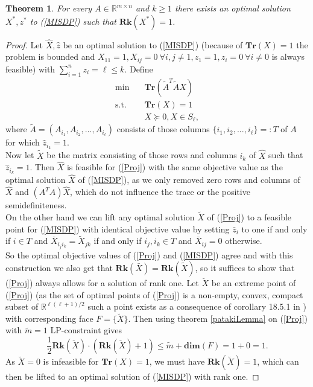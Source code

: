 \documentclass{elsarticle}
\newtheorem{thm}{Theorem}
\newcommand{\R}{\mathds{R}}
\begin{document}
\begin{thm}\label{Rk1thm}
 For every $A \in \R^{m \times n}$ and $k \geq 1$ there exists an optimal solution $X^*, z^*$ to (\ref{MISDP}) such that $\textbf{Rk}(X^*) = 1$. 
\end{thm}
\begin{proof}
 Let $\hat{X}, \hat{z}$ be an optimal solution to (\ref{MISDP}) (because of $\textbf{Tr}(X) = 1$ the problem is bounded and $X_{11} = 1, X_{ij} = 0 \ \forall i,j \neq 1, z_1 = 1, z_i = 0 \ \forall i \neq 0$ is always feasible)
 with $\sum_{i=1}^n z_i = \ell \leq k$. Define
 \begin{align}\label{Proj}
 \text{min} \quad & \textbf{Tr}(\tilde{A}^T\tilde{A}X) \nonumber \\
 \text{s.t.} \quad & \textbf{Tr}(X) = 1 \tag{Proj} \\
 & X \succeq 0 , X \in S_\ell, \nonumber
 \end{align}
where $\tilde{A} = (A_{i_1}, A_{i_2}, ..., A_{i_\ell})$ consists of those columns $\{{i_1}, {i_2}, ..., {i_\ell}\} =: T$ of $A$ for which $\hat{z}_{i_k} = 1$. \\
Now let $\tilde{X}$ be the matrix consisting of those rows and columns 
$i_k$ of $\hat{X}$ such that $\hat{z}_{i_k} = 1$. Then $\hat{X}$ is feasible for (\ref{Proj}) with the same objective value as the optimal solution $\hat{X}$ of (\ref{MISDP}), as we only removed zero rows and columns of $\hat{X}$ 
and $(A^TA)\hat{X}$, which do not influence the trace or the positive semidefiniteness. \\
On the other hand we can lift any optimal solution $\tilde{X}$ of (\ref{Proj}) to a feasible point for (\ref{MISDP}) with identical objective value by setting $\bar{z}_i$ to one if and only if $i \in T$
and $\bar{X}_{i_j i_k} = \tilde{X}_{jk}$ if and only if $i_j, i_k \in T$ and $\bar{X}_{ij}=0$ otherwise. \\
So the optimal objective values of (\ref{Proj}) and (\ref{MISDP}) agree and with this construction we also get that 
$\textbf{Rk}(\bar{X}) = \textbf{Rk}(\tilde{X})$, so it suffices to show that (\ref{Proj}) always allows for a solution of rank one.
Let $\breve{X}$ be an extreme point of (\ref{Proj}) (as the set of optimal points of (\ref{Proj}) is a non-empty, convex, compact subset of $\R^{\ell(\ell+1)/2}$ such a point exists as a consequence of corollary 18.5.1 in
\cite{Roc70}) with corresponding face $F=\{\breve{X}\}$. Then using theorem \ref{patakiLemma} on (\ref{Proj}) with $\tilde{m} = 1$ LP-constraint gives
\begin{equation*}
 \frac{1}{2}\textbf{Rk}(\breve{X})\cdot(\textbf{Rk}(\breve{X})+1) \leq \tilde{m} + \textbf{dim}(F) = 1 + 0 = 1.
\end{equation*}
As $\breve{X}=0$ is infeasible for $\textbf{Tr}(X)=1$, we must have $\textbf{Rk}(\breve{X}) = 1$, which can then be lifted to an optimal solution of (\ref{MISDP}) with rank one.
\end{proof}
\end{document}
